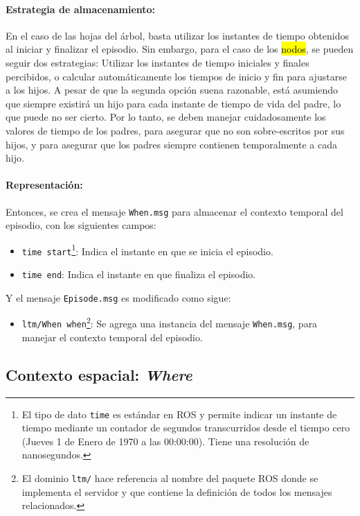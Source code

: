 \paragraph{Estrategia de almacenamiento:}
En el caso de las hojas del árbol, basta utilizar los instantes de tiempo obtenidos al iniciar y finalizar el episodio. Sin embargo, para el caso de los \hl{nodos}, se pueden seguir dos estrategias: Utilizar los instantes de tiempo iniciales y finales percibidos, o calcular automáticamente los tiempos de inicio y fin para ajustarse a los hijos. A pesar de que la segunda opción suena razonable, está asumiendo que siempre existirá un hijo para cada instante de tiempo de vida del padre, lo que puede no ser cierto. Por lo tanto, se deben manejar cuidadosamente los valores de tiempo de los padres, para asegurar que no son sobre-escritos por sus hijos, y para asegurar que los padres siempre contienen temporalmente a cada hijo.

\paragraph{Representación:}
Entonces, se crea el mensaje \texttt{When.msg} para almacenar el contexto temporal del episodio, con los siguientes campos:
\begin{itemize}
	\item \texttt{time start}\footnote{El tipo de dato \texttt{time} es estándar en ROS y permite indicar un instante de tiempo mediante un contador de segundos transcurridos desde el tiempo cero (Jueves 1 de Enero de 1970 a las 00:00:00). Tiene una resolución de nanosegundos.}: Indica el instante en que se inicia el episodio.
	\item \texttt{time end}: Indica el instante en que finaliza el episodio.
\end{itemize}

Y el mensaje \texttt{Episode.msg} es modificado como sigue:
\begin{itemize}
	\item \texttt{ltm/When when}\footnote{El dominio \texttt{ltm/} hace referencia al nombre del paquete ROS donde se implementa el servidor y que contiene la definición de todos los mensajes relacionados.}: Se agrega una instancia del mensaje \texttt{When.msg}, para manejar el contexto temporal del episodio.
\end{itemize}

 
\subsection{Contexto espacial: \textit{Where}}

